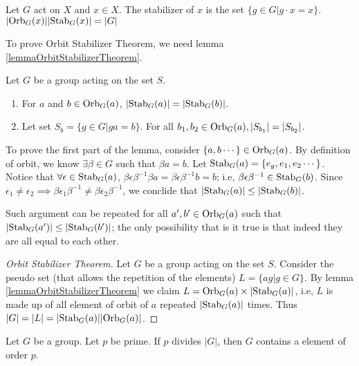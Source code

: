 \documentclass[../note.tex]{subfiles}
\begin{document}
\begin{theorem}
	Let $G$ act on $X$ and $x \in X$. The stabilizer of $x$ is the set $\{g \in G | g\cdot x = x\}$.
	$|\text{Orb}_{G}({x})||\text{Stab}_{G}({x})|=|G|$
\end{theorem}

To prove Orbit Stabilizer Theorem, we need lemma \ref{lemmaOrbitStabilizerTheorem}.

\begin{lemma}\label{lemmaOrbitStabilizerTheorem}
	Let $G$ be a group acting on the set $S$.
\begin{enumerate}
	\item For $a$ and $b\in \text{Orb}_{G}({a})$, $|\text{Stab}_{G}({a})|=|\text{Stab}_{G}({b})|$.
	\item Let set $S_b=\{g\in G| ga=b \}$. For all $b_1, b_2 \in \text{Orb}_{G}({a}), |S_{b_1}|=|S_{b_2}|$.
\end{enumerate}
\end{lemma}

To prove the first part of the lemma, consider $\{a,b \cdots\}\in \text{Orb}_{G}({a})$. By definition of orbit, we know $\exists \beta \in G $ such that $\beta a = b$.
Let $\text{Stab}_{G}({a}) = \{e_g, e_1, e_2 \cdots\}$. Notice that $\forall \epsilon \in \text{Stab}_{G}({a})$, $\beta \epsilon \beta^{-1} \beta a = \beta \epsilon \beta^{-1} b = b$; i.e, $\beta \epsilon \beta^{-1} \in \text{Stab}_{G}({b})$. 
Since $\epsilon_1 \neq \epsilon_2 \implies \beta \epsilon_1 \beta^{-1} \neq \beta \epsilon_2 \beta ^{-1}$, we conclide that $|\text{Stab}_{G}({a})| \leq |\text{Stab}_{G}({b})| $.

Such argument can be repeated for all $a',b' \in \text{Orb}_{G}({a})$ such that $|\text{Stab}_{G}({a'})| \leq |\text{Stab}_{G}({b'})|$; the only possibility that is it true is that indeed they are all equal to each other.

\begin{proof}[Orbit Stabilizer Theorem]
	Let $G$ be a group acting on the set $S$. 
	Consider the pseudo set (that allows the repetition of the elements) $L=\{ag| g\in G\}$. 
	By lemma \ref{lemmaOrbitStabilizerTheorem} we claim $L=\text{Orb}_{G}({a}) \times |\text{Stab}_{G}({a})|$, i.e, $L$ is made up of all element of orbit of $a$ repeated $|\text{Stab}_{G}({a})|$ times. Thus $|G|=|L|=|\text{Stab}_{G}({a})||\text{Orb}_{G}({a})|$.
\end{proof}

\begin{theorem}
	Let $G$ be a group. Let $p$ be prime. If $p$ divides $|G|$, then $G$ contains a element of order $p$.
\end{theorem}
\end{document}
